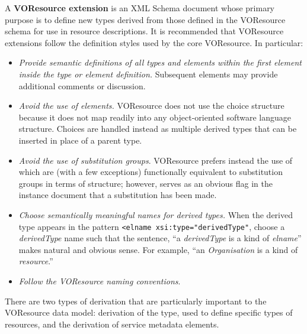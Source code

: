 \documentclass[11pt,a4paper]{ivoa}
\begin{document}
A \textbf{VOResource extension} is an XML Schema document whose primary
purpose is to define new types derived from those defined in the
VOResource schema for use in resource descriptions.  It is recommended
that VOResource extensions follow the definition styles used by the core
VOResource.  In particular: 

\begin{itemize}
  \item \emph{Provide semantic definitions of all types and elements within
       the first  element inside
       the type or element definition.}  Subsequent
        elements may provide
       additional comments or discussion.  

  \item \emph{Avoid the use of  elements.}
       VOResource does not use the choice structure because it does
       not map readily into any object-oriented software language
       structure.  Choices are handled instead as multiple derived
       types that can be inserted in place of a parent type.  

  \item \emph{Avoid the use of substitution groups}.  VOResource
       prefers instead the use of  which are
       (with a few exceptions) functionally equivalent to substitution
       groups in terms of structure; however, 
       serves as an obvious flag in the instance document that a
       substitution has been made. 

  \item \emph{Choose semantically meaningful names for derived
       types.}  When the derived type appears in the pattern
       \verb|<elname xsi:type="derivedType"|,
       choose a \textit{derivedType} name such that the sentence, ``a
       \textit{derivedType} is a kind of \textit{elname}'' makes natural
       and obvious sense.  For example, ``an \textit{Organisation} is a
       kind of \textit{resource}.'' 

  \item \emph{Follow the VOResource naming conventions}. 
\end{itemize}



There are two types of derivation that are particularly important to
the VOResource data model:  derivation of the 
type, used to define specific types of resources, and the derivation
of service metadata elements.  
\end{document}
